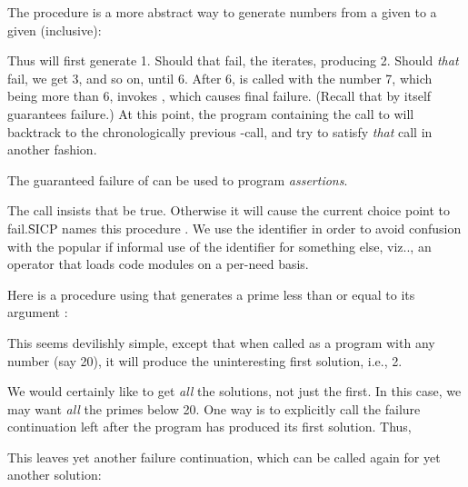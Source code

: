 The procedure  is
a more abstract way to generate numbers from a given 
to a given  (inclusive):


\n  Thus  will first
generate 1.  Should that fail, the  iterates,
producing 2.  Should {\em that} fail, we get 3, and
so on, until 6.  After 6,  is called with
the number 7, which being more than 6, invokes
, which causes final failure.   (Recall that
 by itself guarantees
failure.)  At this point, the program containing the
call to
 will backtrack to the
chronologically previous -call, and try to
satisfy {\em that} call in another fashion.

The guaranteed failure of  can be used to program
{\em assertions}.


\n The call  insists that  be
true.  Otherwise it will cause the current  choice
point to fail.\f{SICP names this procedure
.  We use the identifier  in order to
avoid confusion with the popular if informal use of
the identifier  for something else, viz.., an
operator that loads code modules on a per-need basis.}

Here is a procedure using  that generates a prime
less than or equal to its argument :


\n This seems devilishly simple, except that when called as
a program with any number (say 20), it will produce the
uninteresting first solution, i.e., 2.

We would certainly like to get {\em all} the solutions,
not just the first.  In this case, we may want {\em all}
the primes below
20.  One way is to explicitly call the failure
continuation left after the program has produced its first
solution.  Thus,


\n This leaves yet another failure continuation, which can
be called again for yet another solution:


